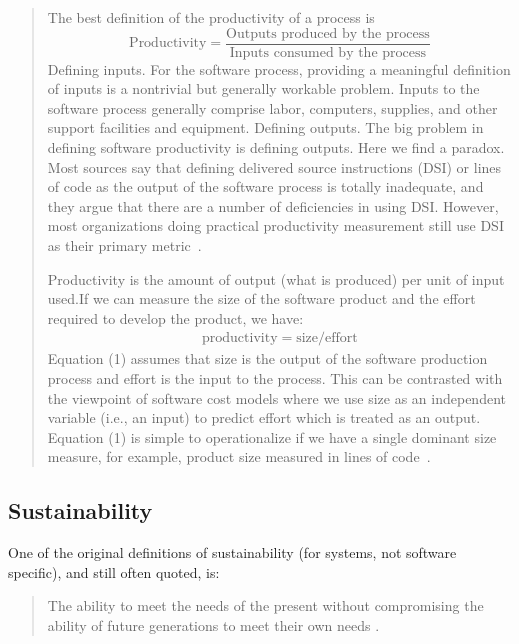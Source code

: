 \documentclass[letterpaper,cleveref]{lipics-v2019}
\theoremstyle{definition}
\begin{document}
\begin{quotation}
    The best definition of the productivity of a process is
    \[\text{Productivity} = \dfrac{\text{Outputs produced by the
          process}}{\text{Inputs consumed by the process}}\]
    Defining inputs. For the software process, providing a meaningful definition
    of inputs is a nontrivial but generally workable problem. Inputs to the
    software process generally comprise labor, computers, supplies, and other
    support facilities and equipment. Defining outputs. The big problem in
    defining software productivity is defining outputs. Here we find a
    paradox. Most sources say that defining delivered source instructions (DSI)
    or lines of code as the output of the software process is totally
    inadequate, and they argue that there are a number of deficiencies in using
    DSI. However, most organizations doing practical productivity measurement
    still use DSI as their primary metric~\cite{Boehm1987}.

    \smallskip
    Productivity is the amount of output (what is produced) per unit of input used.If we can measure the size of the software product and the effort required to develop the product, we have:
    \begin{align}
        \text{productivity} = \text{size}/\text{effort}
    \end{align}
    Equation (1) assumes that size is the output of the software production
    process and effort is the input to the process. This can be contrasted with
    the viewpoint of software cost models where we use size as an independent
    variable (i.e., an input) to predict effort which is treated as an
    output. Equation (1) is simple to operationalize if we have a single
    dominant size measure, for example, product size measured in lines of
    code~\cite{Kitchenham2004}.
\end{quotation}

\subsection{Sustainability}

One of the original definitions of sustainability (for systems, not software
specific), and still often quoted, is:

\begin{quotation}
\noindent The ability to meet the needs of the present without compromising the ability of
future generations to meet their own needs \cite{Brundtland1987}.
\end{quotation}
\end{document}
